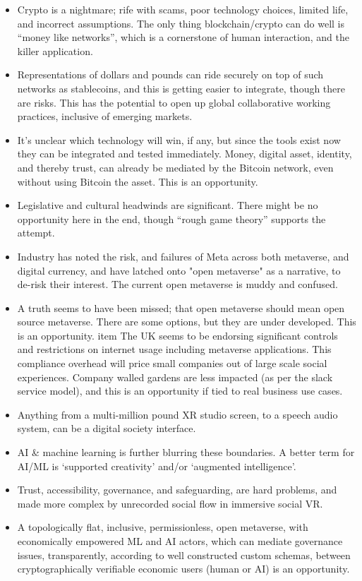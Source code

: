 \begin{itemize}
\item Crypto is a nightmare; rife with scams, poor technology choices, limited life, and incorrect assumptions. The only thing blockchain/crypto can do well is ``money like networks'', which is a cornerstone of human interaction, and the killer application.
\item Representations of dollars and pounds can ride securely on top of such networks as stablecoins, and this is getting easier to integrate, though there are risks. This has the potential to open up global collaborative working practices, inclusive of emerging markets.
\item It's unclear which technology will win, if any, but since the tools exist now they can be integrated and tested immediately. Money, digital asset, identity, and thereby trust, can already be mediated by the Bitcoin network, even without using Bitcoin the asset. This is an opportunity.
\item Legislative and cultural headwinds are significant. There might be no opportunity here in the end, though ``rough game theory'' supports the attempt.
\item Industry has noted the risk, and failures of Meta across both metaverse, and digital currency, and have latched onto "open metaverse" as a narrative, to de-risk their interest. The current open metaverse is muddy and confused. 
\item A truth seems to have been missed; that open metaverse should mean open source metaverse. There are some options, but they are under developed. This is an opportunity.
item The UK seems to be endorsing significant controls and restrictions on internet usage including metaverse applications. This compliance overhead will price small companies out of large scale social experiences. Company walled gardens are less impacted (as per the slack service model), and this is an opportunity if tied to real business use cases.
\item Anything from a multi-million pound XR studio screen, to a speech audio system, can be a digital society interface.
\item AI \& machine learning is further blurring these boundaries. A better term for AI/ML is `supported creativity' and/or `augmented intelligence'.
\item Trust, accessibility, governance, and safeguarding, are hard problems, and made more complex by unrecorded social flow in immersive social VR.
\item A topologically flat, inclusive, permissionless, open metaverse, with economically empowered ML and AI actors, which can mediate governance issues, transparently, according to well constructed custom schemas, between cryptographically verifiable economic users (human or AI) is an opportunity.

\end{itemize}
